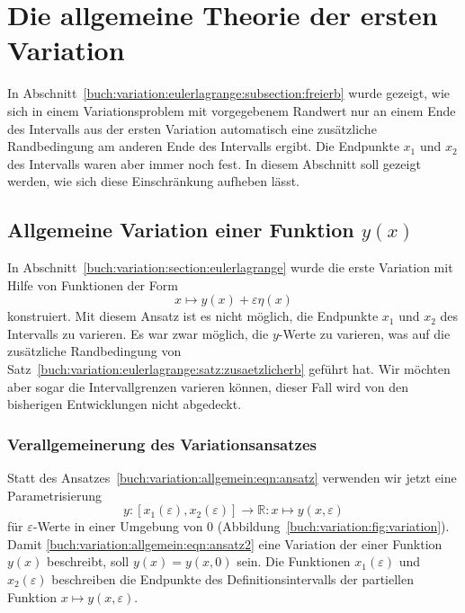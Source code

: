 %
%
%
\section{Die allgemeine Theorie der ersten Variation
\label{buch:variation:section:allgemein}}
In Abschnitt~\ref{buch:variation:eulerlagrange:subsection:freierb}
wurde gezeigt, wie sich in einem Variationsproblem mit vorgegebenem
Randwert nur an einem Ende des Intervalls aus der ersten Variation
automatisch eine zusätzliche Randbedingung am anderen Ende des
Intervalls ergibt.
Die Endpunkte $x_1$ und $x_2$ des Intervalls waren aber immer noch 
fest.
In diesem Abschnitt soll gezeigt werden, wie sich diese Einschränkung
aufheben lässt.

%
%
\subsection{Allgemeine Variation einer Funktion $y(x)$
\label{buch:variation:allgemein:subsection:vary}}
In Abschnitt~\ref{buch:variation:section:eulerlagrange} wurde die
erste Variation mit Hilfe von Funktionen der Form
\begin{equation}
x
\mapsto
y(x)+\varepsilon\eta(x)
\label{buch:variation:allgemein:eqn:ansatz}
\end{equation}
konstruiert.
Mit diesem Ansatz ist es nicht möglich, die Endpunkte $x_1$ und $x_2$
des Intervalls zu varieren.
Es war zwar möglich, die $y$-Werte zu varieren, was auf die zusätzliche
Randbedingung von
Satz~\ref{buch:variation:eulerlagrange:satz:zusaetzlicherb}
geführt hat.
Wir möchten aber sogar die Intervallgrenzen varieren können, dieser
Fall wird von den bisherigen Entwicklungen nicht abgedeckt.

%
%
\subsubsection{Verallgemeinerung des Variationsansatzes}
%
Statt des Ansatzes~\eqref{buch:variation:allgemein:eqn:ansatz}
verwenden wir jetzt eine Parametrisierung
\begin{equation}
y
\colon
[x_1(\varepsilon),x_2(\varepsilon)]
\to
\mathbb{R}
:
x\mapsto y(x,\varepsilon)
\label{buch:variation:allgemein:eqn:ansatz2}
\end{equation}
für $\varepsilon$-Werte in einer Umgebung von $0$
(Abbildung~\ref{buch:variation:fig:variation}).
Damit
\eqref{buch:variation:allgemein:eqn:ansatz2}
eine Variation der einer Funktion $y(x)$ beschreibt, soll
$y(x) = y(x,0)$ sein.
Die Funktionen $x_1(\varepsilon)$ und $x_2(\varepsilon)$ beschreiben
die Endpunkte des Definitionsintervalls der partiellen Funktion
$x\mapsto y(x,\varepsilon)$.

